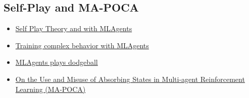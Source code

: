 \documentclass[11pt,a4paper]{article}
\begin{document}
\subsection{Self-Play and MA-POCA}\label{self-play-and-ma-poca}

\begin{itemize}
\tightlist
\item
  \href{https://blog.unity.com/technology/training-intelligent-adversaries-using-self-play-with-ml-agents}{Self Play Theory and with MLAgents}
\item
  \href{https://blog.unity.com/technology/ml-agents-v20-release-now-supports-training-complex-cooperative-behaviors}{Training complex behavior with MLAgents}
\item
  \href{https://blog.unity.com/technology/ml-agents-plays-dodgeball}{MLAgents plays dodgeball}
\item
  \href{https://arxiv.org/pdf/2111.05992.pdf}{On the Use and Misuse of Absorbing States in Multi-agent Reinforcement Learning (MA-POCA)}
\end{itemize}
\end{document}
